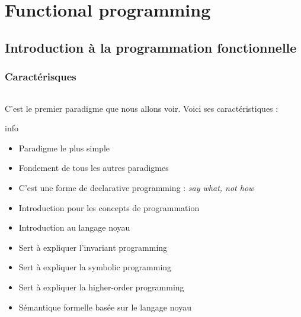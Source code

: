 \part{Functional programming}
\chapter{Introduction à la programmation fonctionnelle}
\minitoc
\newpage

\section{Caractérisques}

    \paragraph{}C'est le premier paradigme que nous allons voir. Voici ses caractéristiques :

        \begin{tbox}{info} %
            \begin{itemize}[label=\textbullet, font=\small]
                \item Paradigme le plus simple
                \item Fondement de {\color{success} tous les autres paradigmes}
                \item C'est une forme de declarative programming : \textit{say what, not how}
            \end{itemize}
            \tcblower
            \begin{itemize}[label=\textbullet, font=\small]
                \item Introduction pour les concepts de programmation
                \item Introduction au langage noyau
                \item Sert à expliquer l'{\color{danger}invariant programming}
                \item Sert à expliquer la {\color{danger}symbolic programming}
                \item Sert à expliquer la {\color{danger}higher-order programming}
                \item {\color{danger} Sémantique formelle} basée sur le langage noyau
            \end{itemize}
        \end{tbox}